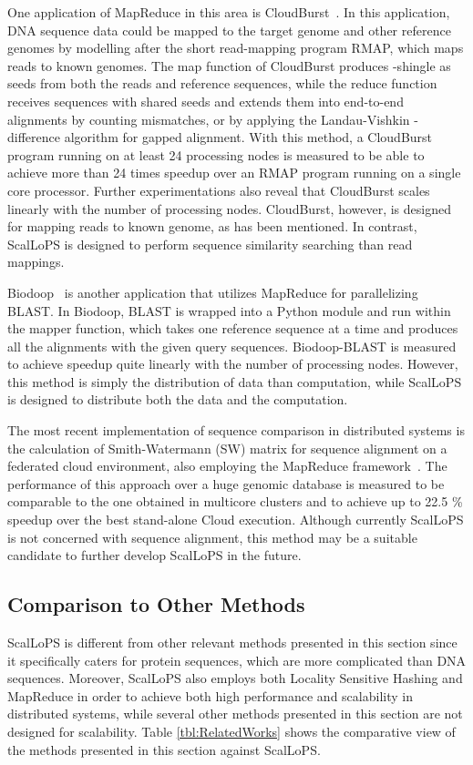 \documentclass[titlepage]{csetr}
\begin{document}
One application of MapReduce in this area is CloudBurst~\cite{CloudBurst}. In this application, DNA sequence data could be mapped to the target genome and other reference genomes by modelling after the short read-mapping program RMAP, which maps reads to known genomes. The map function of CloudBurst produces -shingle as seeds from both the reads and reference sequences, while the reduce function receives sequences with shared seeds and extends them into end-to-end alignments by counting mismatches, or by applying the Landau-Vishkin -difference algorithm for gapped alignment. With this method, a CloudBurst program running on at least 24 processing nodes is measured to be able to achieve more than 24 times speedup over an RMAP program running on a single core processor. Further experimentations also reveal that CloudBurst scales linearly with the number of processing nodes. CloudBurst, however, is designed for mapping reads to known genome, as has been mentioned. In contrast, ScalLoPS is designed to perform sequence similarity searching than read mappings.

Biodoop~\cite{Biodoop} is another application that utilizes MapReduce for parallelizing BLAST. In Biodoop, BLAST is wrapped into a Python module and run within the mapper function, which takes one reference sequence at a time and produces all the alignments with the given query sequences. Biodoop-BLAST is measured to achieve speedup quite linearly with the number of processing nodes. However, this method is simply the distribution of data than computation, while ScalLoPS is designed to distribute both the data and the computation.

The most recent implementation of sequence comparison in distributed systems is the calculation of Smith-Watermann (SW) matrix for sequence alignment on a federated cloud environment, also employing the MapReduce framework~\cite{BioseqComparisonFederatedClouds}. The performance of this approach over a huge genomic database is measured to be comparable to the one obtained in multicore clusters and to achieve up to 22.5 \% speedup over the best stand-alone Cloud execution. Although currently ScalLoPS is not concerned with sequence alignment, this method may be a suitable candidate to further develop ScalLoPS in the future.

\subsection{Comparison to Other Methods}
ScalLoPS is different from other relevant methods presented in this section since it specifically caters for protein sequences, which are more complicated than DNA sequences. Moreover, ScalLoPS also employs both Locality Sensitive Hashing and MapReduce in order to achieve both high performance and scalability in distributed systems, while several other methods presented in this section are not designed for scalability. Table \ref{tbl:RelatedWorks} shows the comparative view of the methods presented in this section against ScalLoPS.
\end{document}
